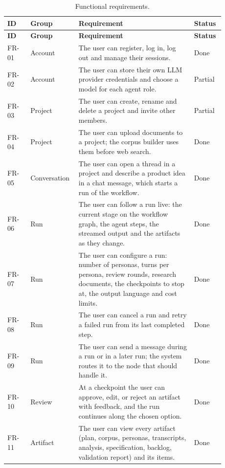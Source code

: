 \begingroup{}
\begin{longtable}{|p{0.1\linewidth}|p{0.17\linewidth}|p{0.5\linewidth}|p{0.11\linewidth}|}
    \caption{Functional requirements.}
    \label{tab:sd-fr} \\
    \hline
    \textbf{ID} & \textbf{Group} & \textbf{Requirement} & \textbf{Status} \\
    \hline
    \endfirsthead
    \hline
    \textbf{ID} & \textbf{Group} & \textbf{Requirement} & \textbf{Status} \\
    \hline
    \endhead
    FR-01 & Account & The user can register, log in, log out and manage their sessions. & Done \\ \hline
    FR-02 & Account & The user can store their own LLM provider credentials and choose a model for each agent role. & Partial \\ \hline
    FR-03 & Project & The user can create, rename and delete a project and invite other members. & Partial \\ \hline
    FR-04 & Project & The user can upload documents to a project; the corpus builder uses them before web search. & Done \\ \hline
    FR-05 & Conversation & The user can open a thread in a project and describe a product idea in a chat message, which starts a run of the workflow. & Done \\ \hline
    FR-06 & Run & The user can follow a run live: the current stage on the workflow graph, the agent steps, the streamed output and the artifacts as they change. & Done \\ \hline
    FR-07 & Run & The user can configure a run: number of personas, turns per persona, review rounds, research documents, the checkpoints to stop at, the output language and cost limits. & Done \\ \hline
    FR-08 & Run & The user can cancel a run and retry a failed run from its last completed step. & Done \\ \hline
    FR-09 & Run & The user can send a message during a run or in a later run; the system routes it to the node that should handle it. & Done \\ \hline
    FR-10 & Review & At a checkpoint the user can approve, edit, or reject an artifact with feedback, and the run continues along the chosen option. & Done \\ \hline
    FR-11 & Artifact & The user can view every artifact (plan, corpus, personas, transcripts, analysis, specification, backlog, validation report) and its items. & Done \\ \hline

\end{longtable}
